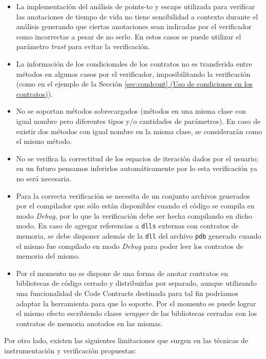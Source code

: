 \documentclass[12pt,a4paper]{article}
\newcommand\mono[1]{\texttt{#1}}
\begin{document}
			\begin{itemize}
				\item La implementación del análisis de points-to y escape utilizada para verificar las anotaciones de tiempo de vida no tiene sensibilidad a contexto durante el análisis generando que ciertas anotaciones sean indicadas por el verificador como incorrectas a pesar de no serlo. En estos casos se puede utilizar el parámetro \textit{trust} para evitar la verificación.
				\item La información de los condicionales de los contratos no es transferida entre métodos en algunos casos por el verificador, imposibilitando la verificación (como en el ejemplo de la Sección \hyperref[sec:condcont]{\ref*{sec:condcont} (Uso de condiciones en los contratos)}).
				\item No se soportan métodos sobrecargados (métodos en una misma clase con igual nombre pero diferentes tipos y/o cantidades de parámetros). En caso de existir dos métodos con igual nombre en la misma clase, se considerarán como el mismo método.
				\item No se verifica la correctitud de los espacios de iteración dados por el usuario; en un futuro pensamos inferirlos automáticamente por lo esta verificación ya no será necesaria.
				\item Para la correcta verificación se necesita de un conjunto archivos generados por el compilador que sólo están disponibles cuando el código se compila en modo \textit{Debug}, por lo que la verificación debe ser hecha compilando en dicho modo. En caso de agregar referencias a \mono{dlls} externas con contratos de memoria, se debe disponer además de la \mono{dll} del archivo \mono{pdb} generado cuando el mismo fue compilado en modo \textit{Debug} para poder leer los contratos de memoria del mismo.
				\item Por el momento no se dispone de una forma de anotar contratos en bibliotecas de código cerrado y distribuirlas por separado, aunque utilizando una funcionalidad de Code Contracts destinada para tal fin podríamos adaptar la herramienta para que lo soporte. Por el momento se puede lograr el mismo efecto escribiendo clases \textit{wrapper} de las bibliotecas cerradas con los contratos de memoria anotados en las mismas.
			\end{itemize}

			Por otro lado, existen las siguientes limitaciones que surgen en las técnicas de instrumentación y verificación propuestas:
\end{document}
